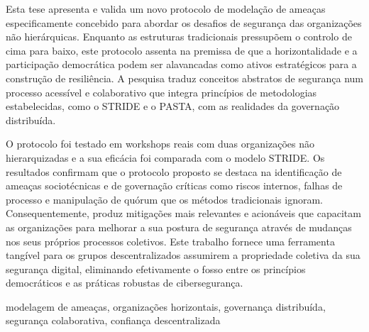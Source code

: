 
%

Esta tese apresenta e valida um novo protocolo de modelação de ameaças
especificamente concebido para abordar os desafios de segurança das organizações
não hierárquicas. Enquanto as estruturas tradicionais pressupõem o controlo de
cima para baixo, este protocolo assenta na premissa de que a horizontalidade e a
participação democrática podem ser alavancadas como ativos estratégicos para a
construção de resiliência. A pesquisa traduz conceitos abstratos de segurança num processo
acessível e colaborativo que integra princípios de metodologias estabelecidas,
como o STRIDE e o PASTA, com as realidades da governação distribuída.

O protocolo foi testado em workshops reais com duas organizações não
hierarquizadas e a sua eficácia foi comparada com o modelo STRIDE. Os
resultados confirmam que o protocolo proposto se destaca na identificação de
ameaças sociotécnicas e de governação críticas como riscos internos, falhas de
processo e manipulação de quórum que os métodos tradicionais ignoram.
Consequentemente, produz mitigações mais relevantes e acionáveis que capacitam
as organizações para melhorar a sua postura de segurança através de mudanças nos
seus próprios processos coletivos. Este trabalho fornece uma ferramenta tangível
para os grupos descentralizados assumirem a propriedade coletiva da sua
segurança digital, eliminando efetivamente o fosso entre os princípios
democráticos e as práticas robustas de cibersegurança.

\begin{keywords}
  modelagem de ameaças, organizações horizontais, governança distribuída,
  segurança colaborativa, confiança descentralizada
\end{keywords}
  